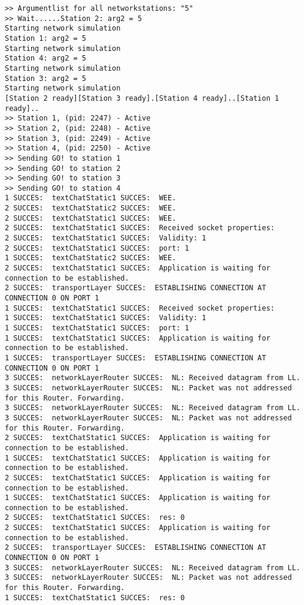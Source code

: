 \begin{lstlisting}[breaklines=true]
>> Argumentlist for all networkstations: "5"
>> Wait......Station 2: arg2 = 5
Starting network simulation
Station 1: arg2 = 5
Starting network simulation
Station 4: arg2 = 5
Starting network simulation
Station 3: arg2 = 5
Starting network simulation
[Station 2 ready][Station 3 ready].[Station 4 ready]..[Station 1 ready]..
>> Station 1, (pid: 2247) - Active
>> Station 2, (pid: 2248) - Active
>> Station 3, (pid: 2249) - Active
>> Station 4, (pid: 2250) - Active
>> Sending GO! to station 1
>> Sending GO! to station 2
>> Sending GO! to station 3
>> Sending GO! to station 4
1 SUCCES:  textChatStatic1 SUCCES:  WEE.
2 SUCCES:  textChatStatic2 SUCCES:  WEE.
2 SUCCES:  textChatStatic1 SUCCES:  WEE.
2 SUCCES:  textChatStatic1 SUCCES:  Received socket properties:
2 SUCCES:  textChatStatic1 SUCCES:  Validity: 1
2 SUCCES:  textChatStatic1 SUCCES:  port: 1
1 SUCCES:  textChatStatic2 SUCCES:  WEE.
2 SUCCES:  textChatStatic1 SUCCES:  Application is waiting for connection to be established.
2 SUCCES:  transportLayer SUCCES:  ESTABLISHING CONNECTION AT CONNECTION 0 ON PORT 1
1 SUCCES:  textChatStatic1 SUCCES:  Received socket properties:
1 SUCCES:  textChatStatic1 SUCCES:  Validity: 1
1 SUCCES:  textChatStatic1 SUCCES:  port: 1
1 SUCCES:  textChatStatic1 SUCCES:  Application is waiting for connection to be established.
1 SUCCES:  transportLayer SUCCES:  ESTABLISHING CONNECTION AT CONNECTION 0 ON PORT 1
3 SUCCES:  networkLayerRouter SUCCES:  NL: Received datagram from LL.
3 SUCCES:  networkLayerRouter SUCCES:  NL: Packet was not addressed for this Router. Forwarding.
3 SUCCES:  networkLayerRouter SUCCES:  NL: Received datagram from LL.
3 SUCCES:  networkLayerRouter SUCCES:  NL: Packet was not addressed for this Router. Forwarding.
2 SUCCES:  textChatStatic1 SUCCES:  Application is waiting for connection to be established.
1 SUCCES:  textChatStatic1 SUCCES:  Application is waiting for connection to be established.
2 SUCCES:  textChatStatic1 SUCCES:  Application is waiting for connection to be established.
1 SUCCES:  textChatStatic1 SUCCES:  Application is waiting for connection to be established.
2 SUCCES:  textChatStatic1 SUCCES:  res: 0
2 SUCCES:  textChatStatic1 SUCCES:  Application is waiting for connection to be established.
2 SUCCES:  transportLayer SUCCES:  ESTABLISHING CONNECTION AT CONNECTION 0 ON PORT 1
3 SUCCES:  networkLayerRouter SUCCES:  NL: Received datagram from LL.
3 SUCCES:  networkLayerRouter SUCCES:  NL: Packet was not addressed for this Router. Forwarding.
1 SUCCES:  textChatStatic1 SUCCES:  res: 0

\end{lstlisting}
